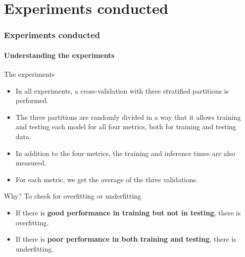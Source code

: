 \section{Experiments conducted}
\begin{frame}
	\frametitle{Experiments conducted}
	\framesubtitle{Understanding the experiments}
	
	\begin{block}{The experiments} 
		\scriptsize
		
		\begin{itemize}
			\item In all experiments, a cross-validation with three stratified partitions is performed.
			
			\item The three partitions are randomly divided in a way that it allows training and testing each model for all four metrics, both for training and testing data.
			
			\item In addition to the four metrics, the training and inference times are also measured.
			
			\item For each metric, we get the average of the three validations.  
			
			
		\end{itemize}
	\end{block}

	\begin{exampleblock}{Why? To check for overfitting or underfitting} 
	\begin{itemize}
		\item If there is \textbf{good performance in training but not in testing}, there is overfitting.
		
		\item If there is \textbf{poor performance in both training and testing}, there is underfitting.
	\end{itemize}
	\end{exampleblock}
\end{frame}


